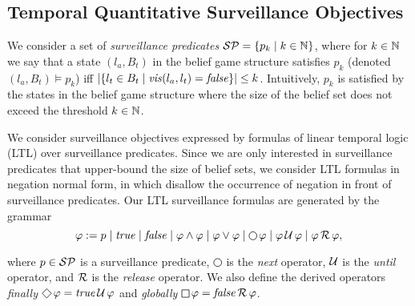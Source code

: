 \begin{itemize}
\end{itemize}

 
\begin{example}
\end{example}


\subsection{Temporal Quantitative Surveillance Objectives}

We consider a set of \emph{surveillance predicates} $\mathcal{SP} = \{p_k \mid k \in \mathbb{N}\}$, where for $k \in \mathbb{N}$ we say that a state $(l_a,B_t)$ in the belief game structure satisfies $p_k$ (denoted $(l_a,B_t) \models p_k$) iff 
$|\{l_t \in B_t \mid \mathit{vis}(l_a,l_t)  = \mathit{false} \}| \leq k$. Intuitively, $p_k$ is satisfied by the states in the belief game structure where the size of the belief set does not exceed the threshold $k \in \mathbb{N}$.

We consider surveillance objectives expressed by formulas of linear temporal logic (LTL) over surveillance predicates. Since we are only interested in surveillance predicates that upper-bound the size of belief sets, we consider LTL formulas in negation normal form, in which disallow the occurrence of negation in front of surveillance predicates. Our LTL surveillance formulas  are generated by the grammar
\[\varphi := p \mid \true \mid \false \mid \varphi \wedge \varphi \mid \varphi \vee \varphi \mid \LTLnext  \varphi  \mid \varphi \LTLuntil \varphi \mid \varphi \LTLrelease \varphi,\]

where $p \in \mathcal{SP}$ is a surveillance predicate, $\LTLnext$ is the \emph{next} operator, $\operatorname{\mathcal{U}}$ is the \emph{until} operator, and $\operatorname{\mathcal{R}}$ is the \emph{release} operator. We also define the derived operators 
\emph{finally} $\LTLfinally \varphi = \true \LTLuntil \varphi$ and 
\emph{globally} $\LTLglobally \varphi = \false \LTLrelease \varphi$.


